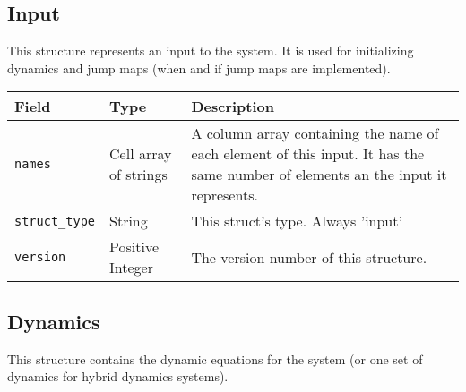 \documentclass{article}
\begin{document}
		\subsection{Input}
			\label{sec:input} %

			This structure represents an input to the system. It is used for initializing dynamics and jump maps (when and if
			jump maps are implemented).\nopagebreak

			\vspace{\baselineskip}\nopagebreak

			\begin{tabular}{ p{} | p{} | p{}}
				Field                    & Type                               & Description                                      \\ \hline
				\lstinline|names|        & \raggedright Cell array of strings & A column array containing the name of each element of
												this input. It has the same number of elements an the
												input it represents.                             \\[1ex]
				\lstinline|struct_type|  & String                             & This struct's type. Always 'input'               \\[1ex]
				\lstinline|version|      & \raggedright Positive Integer      & The version number of this structure.
			\end{tabular}

		\subsection{Dynamics}
			\label{sec:dynamics} %

			This structure contains the dynamic equations for the system (or one set of dynamics for hybrid dynamics systems).

			\vspace{\baselineskip}
\end{document}
